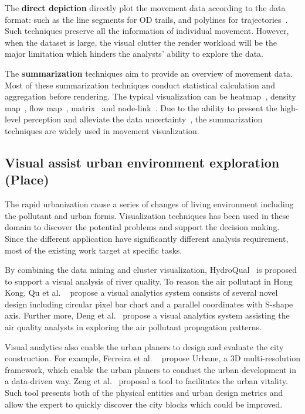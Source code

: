 The \textbf{direct depiction} directly plot the movement data according to the data format: such as the line segments for OD trails, and polylines for trajectories~\cite{andrienko2013visual, ferreira2013visual, kruger2013trajectorylenses}. Such techniques preserve all the information of individual movement. However, when the dataset is large, the visual clutter the render workload will be the major limitation which hinders the analysts’ ability to explore the data.

The \textbf{summarization} techniques aim to provide an overview of movement data. Most of these summarization techniques conduct statistical calculation and aggregation before rendering. The typical visualization can be heatmap~\cite{wilkinson2009history}, density map~\cite{lanir2014visualizing}, flow map~\cite{guo2014origin}, matrix~\cite{wood2010visualisation} and node-link~\cite{von2016mobilitygraphs}. Due to the ability to present the high-level perception and alleviate the data uncertainty~\cite{andrienko2013visual}, the summarization techniques are widely used in movement visualization. 

\subsection{Visual assist urban environment exploration (Place)}
The rapid urbanization cause a series of changes of living environment including the pollutant and urban forms. Visualization techniques has been used in these domain to discover the potential problems and support the decision making. Since the different application have significantly different analysis requirement, most of the existing work target at specific tasks.  

By combining the data mining and cluster visualization, HydroQual~\cite{accorsi2014hydroqual} is proposed to support a visual analysis of river quality. 
To reason the air pollutant in Hong Kong, Qu et al. ~\cite{qu2007visual} propose a visual analytics system consists of several novel design including  circular pixel bar chart and a parallel coordinates with S-shape axis.  Further more, Deng et al.~\cite{deng2019airvis} propose a visual analytics system assisting the air quality analysts in exploring the air pollutant propagation patterns. 

Visual analytics also enable the urban planers to design and evaluate the city construction. For example, Ferreira et al. ~\cite{ferreira2015urbane} propose Urbane, a 3D multi-resolution framework, which enable the urban planers to conduct the urban development in a data-driven way. Zeng et al.~\cite{zeng2018vitalvizor} proposal a tool to facilitates the urban vitality. Such tool presents both of the physical entities and urban design metrics and allow the expert to quickly discover the city blocks which could be improved.
